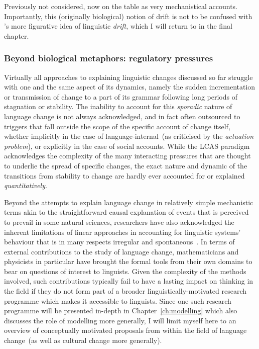 Previously not considered, now on the table as very mechanistical accounts. Importantly, this (originally biological) notion of drift is not to be confused with \citet{Sapir1921}'s more figurative idea of linguistic \emph{drift}, which I will return to in the final chapter.

\subsubsection{Beyond biological metaphors: regulatory pressures}

Virtually all approaches to explaining linguistic changes discussed so far struggle with one and the same aspect of its dynamics, namely the sudden incrementation or transmission of change to a part of its grammar following long periods of stagnation or stability. The inability to account for this \emph{sporadic} nature of language change is not always acknowledged, and in fact often outsourced to triggers that fall outside the scope of the specific account of change itself, whether implicitly in the case of language-internal~(as criticised by the \emph{actuation problem}), or explicitly in the case of social accounts.
While the LCAS paradigm acknowledges the complexity of the many interacting pressures that are thought to underlie the spread of specific changes, the exact nature and dynamic of the transitions from stability to change are hardly ever accounted for or explained \emph{quantitatively}.

Beyond the attempts to explain language change in relatively simple mechanistic terms akin to the straightforward causal explanation of events that is perceived to prevail in some natural sciences, researchers have also acknowledged the inherent limitations of linear approaches in accounting for linguistic systems' behaviour that is in many respects irregular and spontaneous~\citep[see e.g.][]{Fortescue2006}.
In terms of external contributions to the study of language change, mathematicians and physicists in particular have brought the formal tools from their own domains to bear on questions of interest to linguists. Given the complexity of the methods involved, such contributions typically fail to have a lasting impact on thinking in the field if they do not form part of a broader linguistically-motivated research programme which makes it accessible to linguists. Since one such research programme will be presented in-depth in Chapter~\ref{ch:modelling} which also discusses the role of modelling more generally, I will limit myself here to an overview of conceptually motivated proposals from within the field of language change~(as well as cultural change more generally).

